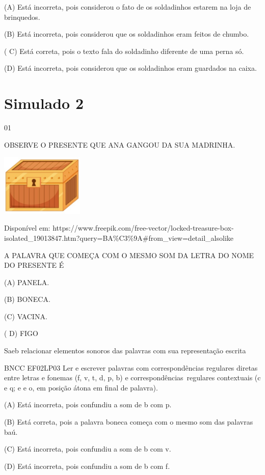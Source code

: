 {{{{{{(A) Está incorreta, pois considerou o fato de os soldadinhos estarem na
loja de brinquedos.

(B) Está incorreta, pois considerou que os soldadinhos eram feitos de
chumbo.

( C) Está correta, pois o texto fala do soldadinho diferente de uma
perna só.

(D) Está incorreta, pois considerou que os soldadinhos eram guardados na
caixa.

\chapter{Simulado 2}

\num{01}

OBSERVE O PRESENTE QUE ANA GANGOU DA SUA MADRINHA.

\includegraphics[width=1.55556in,height=1.16111in]{media/image147.jpeg}

Disponível em:
https://www.freepik.com/free-vector/locked-treasure-box-isolated\_19013847.htm?query=BA\%C3\%9A\#from\_view=detail\_alsolike

A PALAVRA QUE COMEÇA COM O MESMO SOM DA LETRA DO NOME DO PRESENTE É

(A) PANELA.

(B) BONECA.

(C) VACINA.

( D) FIGO

Saeb relacionar elementos sonoros das palavras com sua representação
escrita

BNCC EF02LP03 Ler e escrever palavras com correspondências regulares
diretas entre letras e fonemas (f, v, t, d, p, b) e
correspondências~regulares contextuais (c e q; e e o, em posição átona
em final de palavra).

(A) Está incorreta, \protect\hypertarget{_Hlk129267612}{}{}pois
confundiu a som de b com p.

(B) Está correta, pois a palavra boneca começa com o mesmo som das
palavras baú.

(C) Está incorreta, pois confundiu a som de b com v.

(D) Está incorreta, pois confundiu a som de b com f.

}}}}}}
